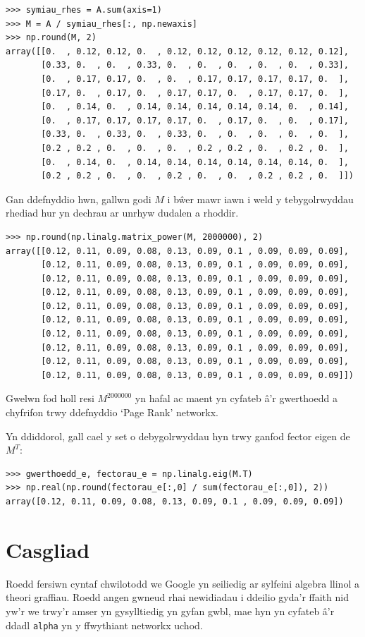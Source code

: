 \documentclass[a4paper]{article}
\begin{document}
\begin{verbatim}
>>> symiau_rhes = A.sum(axis=1)
>>> M = A / symiau_rhes[:, np.newaxis]
>>> np.round(M, 2)
array([[0.  , 0.12, 0.12, 0.  , 0.12, 0.12, 0.12, 0.12, 0.12, 0.12],
       [0.33, 0.  , 0.  , 0.33, 0.  , 0.  , 0.  , 0.  , 0.  , 0.33],
       [0.  , 0.17, 0.17, 0.  , 0.  , 0.17, 0.17, 0.17, 0.17, 0.  ],
       [0.17, 0.  , 0.17, 0.  , 0.17, 0.17, 0.  , 0.17, 0.17, 0.  ],
       [0.  , 0.14, 0.  , 0.14, 0.14, 0.14, 0.14, 0.14, 0.  , 0.14],
       [0.  , 0.17, 0.17, 0.17, 0.17, 0.  , 0.17, 0.  , 0.  , 0.17],
       [0.33, 0.  , 0.33, 0.  , 0.33, 0.  , 0.  , 0.  , 0.  , 0.  ],
       [0.2 , 0.2 , 0.  , 0.  , 0.  , 0.2 , 0.2 , 0.  , 0.2 , 0.  ],
       [0.  , 0.14, 0.  , 0.14, 0.14, 0.14, 0.14, 0.14, 0.14, 0.  ],
       [0.2 , 0.2 , 0.  , 0.  , 0.2 , 0.  , 0.  , 0.2 , 0.2 , 0.  ]])
\end{verbatim}

Gan ddefnyddio hwn, gallwn godi \(M\) i b\^{w}er mawr iawn i weld y
tebygolrwyddau rhediad hur yn dechrau ar unrhyw dudalen a rhoddir.

\begin{verbatim}
>>> np.round(np.linalg.matrix_power(M, 2000000), 2)
array([[0.12, 0.11, 0.09, 0.08, 0.13, 0.09, 0.1 , 0.09, 0.09, 0.09],
       [0.12, 0.11, 0.09, 0.08, 0.13, 0.09, 0.1 , 0.09, 0.09, 0.09],
       [0.12, 0.11, 0.09, 0.08, 0.13, 0.09, 0.1 , 0.09, 0.09, 0.09],
       [0.12, 0.11, 0.09, 0.08, 0.13, 0.09, 0.1 , 0.09, 0.09, 0.09],
       [0.12, 0.11, 0.09, 0.08, 0.13, 0.09, 0.1 , 0.09, 0.09, 0.09],
       [0.12, 0.11, 0.09, 0.08, 0.13, 0.09, 0.1 , 0.09, 0.09, 0.09],
       [0.12, 0.11, 0.09, 0.08, 0.13, 0.09, 0.1 , 0.09, 0.09, 0.09],
       [0.12, 0.11, 0.09, 0.08, 0.13, 0.09, 0.1 , 0.09, 0.09, 0.09],
       [0.12, 0.11, 0.09, 0.08, 0.13, 0.09, 0.1 , 0.09, 0.09, 0.09],
       [0.12, 0.11, 0.09, 0.08, 0.13, 0.09, 0.1 , 0.09, 0.09, 0.09]])
\end{verbatim}

Gwelwn fod holl resi \(M ^ {2000000}\) yn hafal ac maent yn cyfateb \^{a}'r
gwerthoedd a chyfrifon trwy ddefnyddio `Page Rank' networkx.

Yn ddiddorol, gall cael y set o debygolrwyddau hyn trwy ganfod fector eigen de
\(M^{T}\):

\begin{verbatim}
>>> gwerthoedd_e, fectorau_e = np.linalg.eig(M.T)
>>> np.real(np.round(fectorau_e[:,0] / sum(fectorau_e[:,0]), 2))
array([0.12, 0.11, 0.09, 0.08, 0.13, 0.09, 0.1 , 0.09, 0.09, 0.09])
\end{verbatim}

\section{Casgliad}

Roedd fersiwn cyntaf chwilotodd we Google yn seiliedig ar sylfeini algebra
llinol a theori graffiau. Roedd angen gwneud rhai newidiadau i ddeilio gyda'r
ffaith nid yw'r we trwy'r amser yn gysylltiedig yn gyfan gwbl, mae hyn yn
cyfateb \^{a}'r ddadl \texttt{alpha} yn y ffwythiant networkx uchod.



\end{document}
